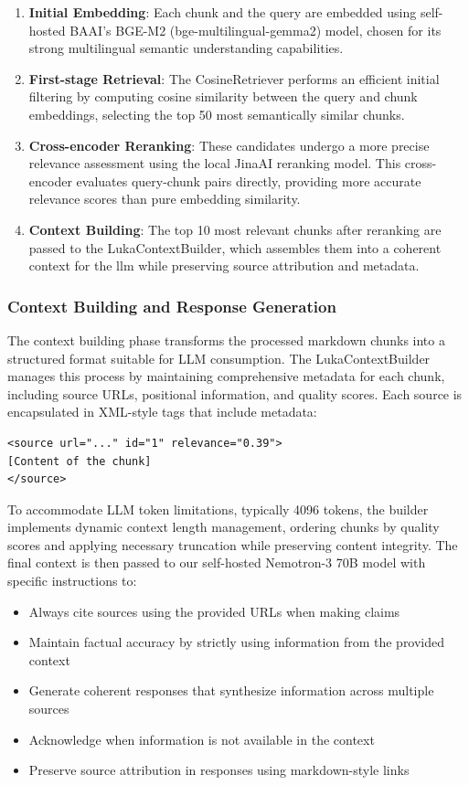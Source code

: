 \documentclass[fleqn,moreauthors,10pt]{ds_report}
\begin{document}
\begin{enumerate}[noitemsep]
    \item \textbf{Initial Embedding}: Each chunk and the query are embedded using self-hosted BAAI's BGE-M2 (bge-multilingual-gemma2) model, chosen for its strong multilingual semantic understanding capabilities.
    
    \item \textbf{First-stage Retrieval}: The CosineRetriever performs an efficient initial filtering by computing cosine similarity between the query and chunk embeddings, selecting the top 50 most semantically similar chunks.
    
    \item \textbf{Cross-encoder Reranking}: These candidates undergo a more precise relevance assessment using the local JinaAI reranking model. This cross-encoder evaluates query-chunk pairs directly, providing more accurate relevance scores than pure embedding similarity.
    
    \item \textbf{Context Building}: The top 10 most relevant chunks after reranking are passed to the LukaContextBuilder, which assembles them into a coherent context for the llm while preserving source attribution and metadata.
\end{enumerate}

\subsubsection*{Context Building and Response Generation}
The context building phase transforms the processed markdown chunks into a structured format suitable for LLM consumption. The LukaContextBuilder manages this process by maintaining comprehensive metadata for each chunk, including source URLs, positional information, and quality scores. Each source is encapsulated in XML-style tags that include metadata:

\begin{verbatim}
<source url="..." id="1" relevance="0.39">
[Content of the chunk]
</source>
\end{verbatim}

To accommodate LLM token limitations, typically 4096 tokens, the builder implements dynamic context length management, ordering chunks by quality scores and applying necessary truncation while preserving content integrity. The final context is then passed to our self-hosted Nemotron-3 70B model with specific instructions to:
\begin{itemize}[noitemsep]
    \item Always cite sources using the provided URLs when making claims
    \item Maintain factual accuracy by strictly using information from the provided context
    \item Generate coherent responses that synthesize information across multiple sources
    \item Acknowledge when information is not available in the context
    \item Preserve source attribution in responses using markdown-style links
\end{itemize}
\end{document}

